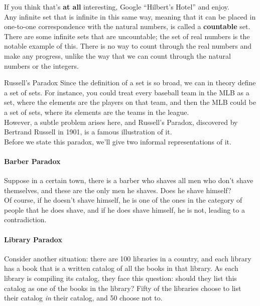 If you think that's \textbf{at all} interesting, Google ``Hilbert's Hotel'' and enjoy.\\

Any infinite set that is infinite in this same way, meaning that it can be placed in one-to-one correspondence with the natural numbers, is called a \textbf{countable} set.  There are some infinite sets that are uncountable; the set of real numbers is the notable example of this.  There is no way to count through the real numbers and make any progress, unlike the way that we can count through the natural numbers or the integers.\\


\begin{proc}{Russell's Paradox}
Since the definition of a set is so broad, we can in theory define a set of sets.  For instance, you could treat every baseball team in the MLB as a set, where the elements are the players on that team, and then the MLB could be a set of sets, where its elements are the teams in the league.\\

However, a subtle problem arises here, and Russell's Paradox, discovered by Bertrand Russell in 1901, is a famous illustration of it.\\

Before we state this paradox, we'll give two informal representations of it.\\

\paragraph{Barber Paradox} Suppose in a certain town, there is a barber who shaves all men who don't shave themselves, and these are the only men he shaves.  Does he shave himself?\\

Of course, if he doesn't shave himself, he is one of the ones in the category of people that he does shave, and if he does shave himself, he is not, leading to a contradiction.\\

\paragraph{Library Paradox} Consider another situation: there are 100 libraries in a country, and each library has a book that is a written catalog of all the books in that library.  As each library is compiling its catalog, they face this question: should they list this catalog as one of the books in the library?  Fifty of the libraries choose to list their catalog \emph{in} their catalog, and 50 choose not to.\\


\end{proc}
